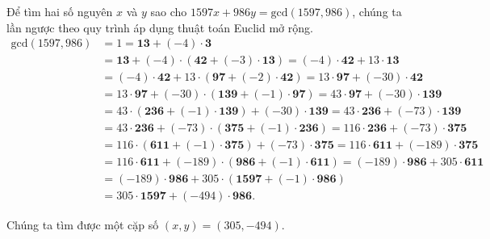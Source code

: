 \begin{example}
    Để tìm hai số nguyên $x$ và $y$ sao cho $1597 x + 986 y = \text{gcd}(1597, 986)$, chúng ta lần ngược theo quy trình áp dụng thuật toán Euclid mở rộng.
    \begin{align*}
        \text{gcd}(1597, 986) & = 1 = \mathbf{13} + (-4)\cdot \mathbf{3}                                                                                          \\
                              & = \mathbf{13} + (-4)\cdot (\mathbf{42} + (-3)\cdot \mathbf{13}) = (-4)\cdot \mathbf{42} + 13\cdot \mathbf{13}                     \\
                              & = (-4)\cdot \mathbf{42} + 13\cdot (\mathbf{97} + (-2)\cdot \mathbf{42}) = 13\cdot \mathbf{97} + (-30)\cdot \mathbf{42}            \\
                              & = 13\cdot \mathbf{97} + (-30)\cdot (\mathbf{139} + (-1)\cdot \mathbf{97}) = 43\cdot \mathbf{97} + (-30)\cdot \mathbf{139}         \\
                              & = 43\cdot (\mathbf{236} + (-1)\cdot \mathbf{139}) + (-30)\cdot \mathbf{139} = 43\cdot \mathbf{236} + (-73)\cdot \mathbf{139}      \\
                              & = 43\cdot \mathbf{236} + (-73)\cdot (\mathbf{375} + (-1)\cdot \mathbf{236}) = 116\cdot \mathbf{236} + (-73)\cdot \mathbf{375}     \\
                              & = 116\cdot (\mathbf{611} + (-1)\cdot \mathbf{375}) + (-73)\cdot \mathbf{375} = 116\cdot \mathbf{611} + (-189)\cdot \mathbf{375}   \\
                              & = 116\cdot \mathbf{611} + (-189)\cdot (\mathbf{986} + (-1)\cdot \mathbf{611})  = (-189)\cdot \mathbf{986} + 305\cdot \mathbf{611} \\
                              & = (-189)\cdot \mathbf{986} + 305\cdot (\mathbf{1597} + (-1)\cdot \mathbf{986})                                                    \\
                              & = 305\cdot \mathbf{1597} + (-494)\cdot \mathbf{986}.
    \end{align*}

    Chúng ta tìm được một cặp số $(x, y) = (305, -494)$.
\end{example}

